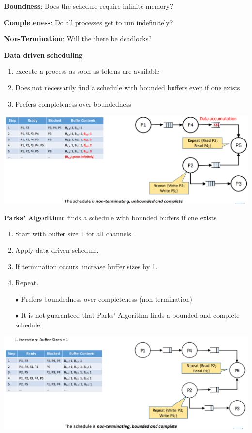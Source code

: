 \documentclass[english]{latex4ei/latex4ei_sheet}
\begin{document}
\textbf{Boundness}: Does the schedule require infinite memory?

\textbf{Completeness}: Do all processes get to run indefinitely?

\textbf{Non-Termination}: Will the there be deadlocks?

\textbf{Data driven scheduling}
\begin{enumerate}
	\item execute a process as soon as tokens are available
	\item Does not necessarily find a schedule with bounded buffers even if one exists
	\item Prefers completeness over boundedness
\end{enumerate}

\begin{center}
  \includegraphics[width=0.8\linewidth]{assets/KPNDataExample.png}
  \label{fig:kpndataexample}
\end{center}

\textbf{Parks' Algorithm}: finds a schedule with bounded buffers if one exists
\begin{enumerate}
	\item Start with buffer size 1 for all channels.
	\item Apply data driven schedule.
	\item If termination occurs, increase buffer sizes by 1.
	\item Repeat.
	\item[$\bullet$] Prefers boundedness over completeness (non-termination)
	\item[$\bullet$] It is not guaranteed that Parks’ Algorithm finds a bounded and complete schedule
\end{enumerate}

\begin{center}
  \includegraphics[width=0.8\linewidth]{assets/KPNExamplePark.png}
  \label{fig:kpnexamplepark}
\end{center}
 
\end{document}
